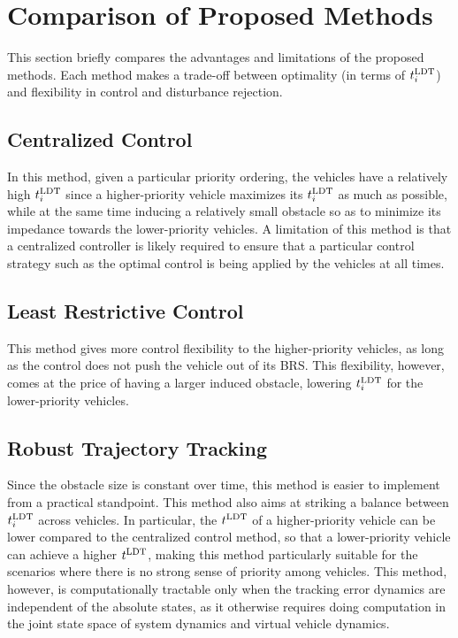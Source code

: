 \section{Comparison of Proposed Methods}
This section briefly compares the advantages and limitations of the proposed methods. Each method makes a trade-off between optimality (in terms of $t^\text{LDT}_i$) and flexibility in control and disturbance rejection.

\subsection{Centralized Control}
In this method, given a particular priority ordering, the vehicles have a relatively high $t^\text{LDT}_i$ since a higher-priority vehicle maximizes its $t^\text{LDT}_i$ as much as possible, while at the same time inducing a relatively small obstacle so as to minimize its impedance towards the lower-priority vehicles. A limitation of this method is that a centralized controller is likely required to ensure that a particular control strategy such as the optimal control is being applied by the vehicles at all times.

\subsection{Least Restrictive Control}
This method gives more control flexibility to the higher-priority vehicles, as long as the control does not push the vehicle out of its BRS. This flexibility, however, comes at the price of having a larger induced obstacle, lowering $t^\text{LDT}_i$ for the lower-priority vehicles.  

\subsection{Robust Trajectory Tracking}
Since the obstacle size is constant over time, this method is easier to implement from a practical standpoint. This method also aims at striking a balance between $t^\text{LDT}_i$ across vehicles. In particular, the $t^\text{LDT}$ of a higher-priority vehicle can be lower compared to the centralized control method, so that a lower-priority vehicle can achieve a higher $t^\text{LDT}$, making this method particularly suitable for the scenarios where there is no strong sense of priority among vehicles. This method, however, is computationally tractable only when the tracking error dynamics are independent of the absolute states, as it otherwise requires doing computation in the joint state space of system dynamics and virtual vehicle dynamics. 